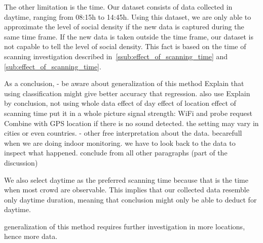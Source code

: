 	The other limitation is the time. Our dataset consists of data collected in daytime, ranging from 08:15h to 14:45h. Using this dataset, we are only able to approximate the level of social density if the new data is captured during the same time frame. If the new data is taken outside the time frame, our dataset is not capable to tell the level of social density. This fact is based on the time of scanning investigation described in~\autoref{ssub:effect_of_scanning_time} and \autoref{sub:effect_of_scanning_time}.
	

	

	

	


	



As a conclusion, 
- be aware about generalization of this method
Explain that using classification might give better accuracy that regression.
also use %
Explain by conclusion, not using whole data
effect of day
effect of location
effect of scanning time
put it in a whole picture
signal strength: WiFi and probe request
Combine with GPS location if there is no sound detected.
the setting may vary in cities or even countries.
- other free interpretation about the data.
becarefull when we are doing indoor monitoring.
we have to look back to the data to inspect what happened.
conclude from all other paragraphs (part of the discussion)

We also select daytime as the preferred scanning time because that is the time when most crowd are observable. This implies that our collected data resemble only daytime duration, meaning that conclusion might only be able to deduct for daytime.

generalization of this method requires further investigation in more locations, hence more data.


